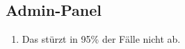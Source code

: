 \subsection{Admin-Panel}

\begin{enumerate}
    \item Das %
        stürzt in 95\% der Fälle nicht ab.
\end{enumerate}